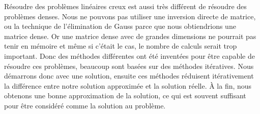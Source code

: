 Résoudre des problèmes linéaires creux est aussi très différent de résoudre des problèmes denses.
%
Nous ne pouvons pas utiliser une inversion directe de matrice, ou la technique de l'élimination de Gauss parce que nous obtiendrions une matrice dense.
%
Or une matrice dense avec de grandes dimensions ne pourrait pas tenir en mémoire et même si c'était le cas, le nombre de calculs serait trop important.
%
Donc des méthodes différentes ont été inventées pour être capable de résoudre ces problèmes, beaucoup sont basées sur des méthodes itératives.
%
Nous démarrons donc avec une solution, ensuite ces méthodes réduisent itérativement la différence entre notre solution approximée et la solution réelle.
%
\`{A} la fin, nous obtenons une bonne approximation de la solution, ce qui est souvent suffisant pour être considéré comme la solution au problème.
